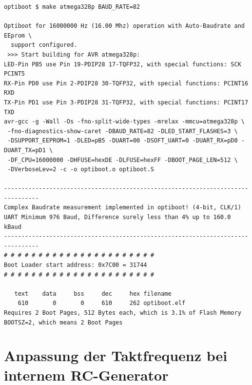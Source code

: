 \begin{verbatim}
optiboot $ make atmega328p BAUD_RATE=82

Optiboot for 16000000 Hz (16.00 Mhz) operation with Auto-Baudrate and EEprom \
  support configured.
 >>> Start building for AVR atmega328p:
LED-Pin PB5 use Pin 19-PDIP28 17-TQFP32, with special functions: SCK PCINT5
RX-Pin PD0 use Pin 2-PDIP28 30-TQFP32, with special functions: PCINT16 RXD
TX-Pin PD1 use Pin 3-PDIP28 31-TQFP32, with special functions: PCINT17 TXD
avr-gcc -g -Wall -Os -fno-split-wide-types -mrelax -mmcu=atmega328p \
 -fno-diagnostics-show-caret -DBAUD_RATE=82 -DLED_START_FLASHES=3 \
 -DSUPPORT_EEPROM=1 -DLED=pB5 -DUART=00 -DSOFT_UART=0 -DUART_RX=pD0 -DUART_TX=pD1 \
 -DF_CPU=16000000 -DHFUSE=hexDE -DLFUSE=hexFF -DBOOT_PAGE_LEN=512 \
 -DVerboseLev=2 -c -o optiboot.o optiboot.S

--------------------------------------------------------------------------------
Complex Baudrate measurement implemented in optiboot! (4-bit, CLK/1)
UART Minimum 976 Baud, Difference surely less than 4% up to 160.0 kBaud
--------------------------------------------------------------------------------
# # # # # # # # # # # # # # # # # # # # # #
Boot Loader start address: 0x7C00 = 31744
# # # # # # # # # # # # # # # # # # # # # #

   text	   data	    bss	    dec	    hex	filename
    610	      0	      0	    610	    262	optiboot.elf
Requires 2 Boot Pages, 512 Bytes each, which is 3.1% of Flash Memory
BOOTSZ=2, which means 2 Boot Pages

\end{verbatim}


\section{Anpassung der Taktfrequenz bei internem RC-Generator}

